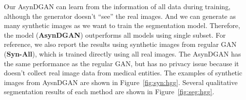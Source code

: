 Our AsynDGAN can learn from the information of all data during training, although the generator doesn't ``see'' the real images. And we can generate as many synthetic images as we want to train the segmentation model. Therefore, the model (\textbf{AsynDGAN}) outperforms all models using single subset. For reference, we also report the results using synthetic images from regular GAN (\textbf{Syn-All}), which is trained directly using all real images. The AsynDGAN has the same performance as the regular GAN, but has no privacy issue because it doesn't collect real image data from medical entities. The examples of synthetic images from AysnDGAN are shown in Figure~\ref{fig:syn:hgg}. Several qualitative segmentation results of each method are shown in Figure~\ref{fig:seg:hgg}.


